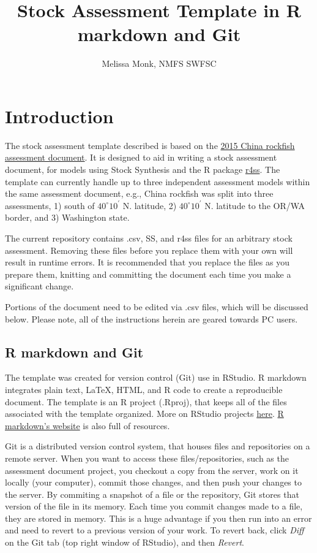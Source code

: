 \documentclass[12pt,]{article}
\title{Stock Assessment Template in R markdown and Git}
\author{Melissa Monk, NMFS SWFSC}
\date{}
\begin{document}
\maketitle

{
\setcounter{tocdepth}{3}
\tableofcontents
}
\newpage

\section{Introduction}\label{introduction}

The stock assessment template described is based on the
\href{http://www.pcouncil.org/wp-content/uploads/2015/08/H3_Att3_China_FULLAssmt_E-Only_SEPT2015BB.pdf}{2015
China rockfish assessment document}. It is designed to aid in writing a
stock assessment document, for models using Stock Synthesis and the R
package \href{https://github.com/r4ss/r4ss}{r4ss}. The template can
currently handle up to three independent assessment models within the
same assessment document, e.g., China rockfish was split into three
assessments, 1) south of \(40^\circ 10^\prime\) N. latitude, 2)
\(40^\circ 10^\prime\) N. latitude to the OR/WA border, and 3)
Washington state.

The current repository contains .csv, SS, and r4ss files for an
arbitrary stock assessment. Removing these files before you replace them
with your own will result in runtime errors. It is recommended that you
replace the files as you prepare them, knitting and committing the
document each time you make a significant change.

Portions of the document need to be edited via .csv files, which will be
discussed below. Please note, all of the instructions herein are geared
towards PC users.

\subsection{R markdown and Git}\label{r-markdown-and-git}

The template was created for version control (Git) use in RStudio. R
markdown integrates plain text, LaTeX, HTML, and R code to create a
reproducible document. The template is an R project (.Rproj), that keeps
all of the files associated with the template organized. More on RStudio
projects
\href{https://support.rstudio.com/hc/en-us/articles/200526207-Using-Projects}{here}.
\href{http://rmarkdown.rstudio.com/}{R markdown's website} is also full
of resources.

Git is a distributed version control system, that houses files and
repositories on a remote server. When you want to access these
files/repositories, such as the assessment document project, you
checkout a copy from the server, work on it locally (your computer),
commit those changes, and then push your changes to the server. By
commiting a snapshot of a file or the repository, Git stores that
version of the file in its memory. Each time you commit changes made to
a file, they are stored in memory. This is a huge advantage if you then
run into an error and need to revert to a previous version of your work.
To revert back, click \emph{Diff} on the Git tab (top right window of
RStudio), and then \emph{Revert}.
\end{document}
